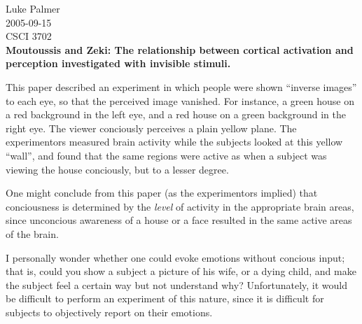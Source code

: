 \documentclass[12pt]{article}
\begin{document}
\noindent Luke Palmer \\
2005-09-15 \\
CSCI 3702 \\
\textbf{\large{Moutoussis and Zeki: The relationship between cortical activation and
perception investigated with invisible stimuli.}}

\onehalfspace

This paper described an experiment in which people were shown ``inverse
images'' to each eye, so that the perceived image vanished.  For
instance, a green house on a red background in the left eye, and a red
house on a green background in the right eye.  The viewer conciously
perceives a plain yellow plane.  The experimentors measured brain
activity while the subjects looked at this yellow ``wall'', and found
that the same regions were active as when a subject was viewing the
house conciously, but to a lesser degree.

One might conclude from this paper (as the experimentors implied) that
conciousness is determined by the \textit{level} of activity in the
appropriate brain areas, since unconcious awareness of a house or a face
resulted in the same active areas of the brain.

I personally wonder whether one could evoke emotions without concious
input; that is, could you show a subject a picture of his wife, or a
dying child, and make the subject feel a certain way but not understand
why?  Unfortunately, it would be difficult to perform an experiment of
this nature, since it is difficult for subjects to objectively report on
their emotions.
\end{document}
